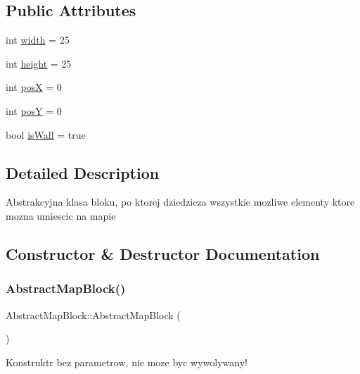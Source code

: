 \subsection*{Public Attributes}
\begin{DoxyCompactItemize}
\item 
int \hyperlink{class_abstract_map_block_afdfb3d8630fb089667c05daa27598ebb}{width} = 25
\item 
int \hyperlink{class_abstract_map_block_ac20fe00ed32681d06378dd62e5901092}{height} = 25
\item 
int \hyperlink{class_abstract_map_block_a5aa7d9d05727ac3b0f0f4746813d77e7}{posX} = 0
\item 
int \hyperlink{class_abstract_map_block_a5e286fbe867af6c78c17e7e21f9948c4}{posY} = 0
\item 
bool \hyperlink{class_abstract_map_block_ae4151be3ea8a899aa9423e57262ef93e}{is\+Wall} = true
\end{DoxyCompactItemize}


\subsection{Detailed Description}
Abstrakcyjna klasa bloku, po ktorej dziedzicza wszystkie mozliwe elementy ktore mozna umiescic na mapie 

\subsection{Constructor \& Destructor Documentation}
\mbox{\label{class_abstract_map_block_ad74ee19189d5564820256e9b76bc5a3b}} 
\subsubsection{\texorpdfstring{Abstract\+Map\+Block()}{AbstractMapBlock()}\hspace{0.1cm}{\footnotesize\ttfamily [1/2]}}
{\footnotesize\ttfamily Abstract\+Map\+Block\+::\+Abstract\+Map\+Block (\begin{DoxyParamCaption}{ }\end{DoxyParamCaption})}

Konstruktr bez parametrow, nie moze byc wywolywany! \mbox{\label{class_abstract_map_block_afea0f904a49f56b417387f721c8677c9}} 
